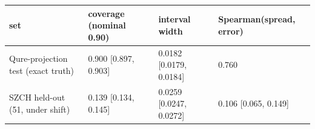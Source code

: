 \begin{tabular}{llll}
\toprule
set & coverage (nominal 0.90) & interval width & Spearman(spread, error) \\
\midrule
Qure-projection test (exact truth) & 0.900 [0.897, 0.903] & 0.0182 [0.0179, 0.0184] & 0.760 \\
SZCH held-out (51, under shift) & 0.139 [0.134, 0.145] & 0.0259 [0.0247, 0.0272] & 0.106 [0.065, 0.149] \\
\bottomrule
\end{tabular}
